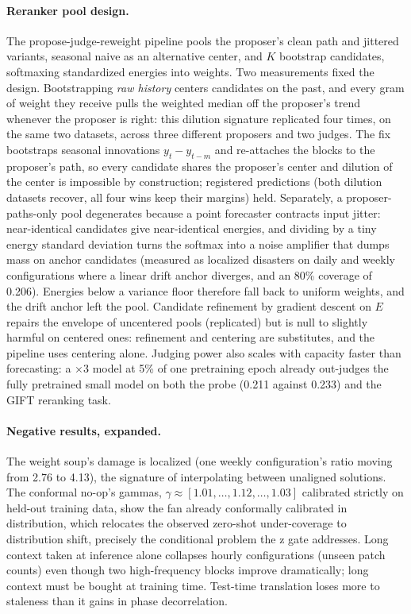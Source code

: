 \paragraph{Reranker pool design.}
The propose-judge-reweight pipeline pools the proposer's clean path and
jittered variants, seasonal naive as an alternative center, and $K$
bootstrap candidates, softmaxing standardized energies into weights.
Two measurements fixed the design. Bootstrapping \emph{raw history}
centers candidates on the past, and every gram of weight they receive
pulls the weighted median off the proposer's trend whenever the proposer
is right: this dilution signature replicated four times, on the same two
datasets, across three different proposers and two judges. The fix
bootstraps seasonal innovations $y_t - y_{t-m}$ and re-attaches the
blocks to the proposer's path, so every candidate shares the proposer's
center and dilution of the center is impossible by construction;
registered predictions (both dilution datasets recover, all four wins
keep their margins) held. Separately, a proposer-paths-only pool
degenerates because a point forecaster contracts input jitter:
near-identical candidates give near-identical energies, and dividing by
a tiny energy standard deviation turns the softmax into a noise
amplifier that dumps mass on anchor candidates (measured as localized
disasters on daily and weekly configurations where a linear drift
anchor diverges, and an 80\% coverage of 0.206). Energies below a
variance floor therefore fall back to uniform weights, and the drift
anchor left the pool. Candidate refinement by gradient descent on $E$
repairs the envelope of uncentered pools (replicated) but is null to
slightly harmful on centered ones: refinement and centering are
substitutes, and the pipeline uses centering alone. Judging power also
scales with capacity faster than forecasting: a $\times 3$ model at 5\%
of one pretraining epoch already out-judges the fully pretrained small
model on both the probe (0.211 against 0.233) and the GIFT reranking
task.

\paragraph{Negative results, expanded.}
The weight soup's damage is localized (one weekly configuration's ratio
moving from 2.76 to 4.13), the signature of interpolating between
unaligned solutions. The conformal no-op's gammas,
$\gamma \approx [1.01, \dots, 1.12, \dots, 1.03]$ calibrated strictly on
held-out training data, show the fan already conformally calibrated in
distribution, which relocates the observed zero-shot under-coverage to
distribution shift, precisely the conditional problem the z gate
addresses. Long context taken at inference alone collapses hourly
configurations (unseen patch counts) even though two high-frequency
blocks improve dramatically; long context must be bought at training
time. Test-time translation loses more to staleness than it gains in
phase decorrelation.

